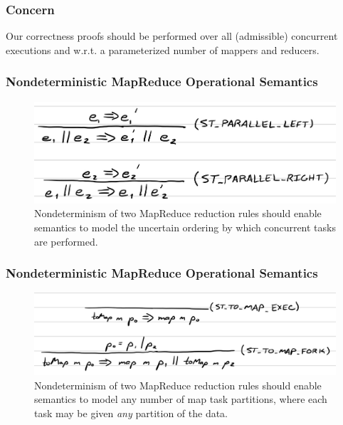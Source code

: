 \begin{frame}
  \frametitle{Concern}
  Our correctness proofs should be performed over all (admissible) concurrent
  executions and w.r.t. a parameterized number of mappers and reducers.
\end{frame}

\begin{frame}
  \frametitle{Nondeterministic MapReduce Operational Semantics}
  \begin{figure}
    \includegraphics[scale=0.33]{img/ST_PARALLEL.jpeg}
    \caption{Nondeterminism of two MapReduce reduction rules should enable
             semantics to model the uncertain ordering by which concurrent tasks
             are performed.}
  \end{figure}
\end{frame}

\begin{frame}
  \frametitle{Nondeterministic MapReduce Operational Semantics}
  \begin{figure}
    \includegraphics[scale=0.25]{img/ST_TO_MAP.jpeg}
    \caption{Nondeterminism of two MapReduce reduction rules should enable
             semantics to model any number of map task partitions, where each
             task may be given \emph{any} partition of the data.}
  \end{figure}
\end{frame}
